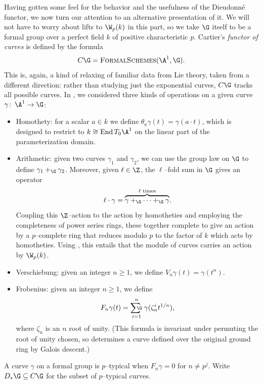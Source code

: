 Having gotten some feel for the behavior and the usefulness of the Dieudonn\'e functor, we now turn our attention to an alternative presentation of it.
We will not have to worry about lifts to \(\W_p(k)\) in this part, so we take \(\G\) itself to be a formal group over a perfect field \(k\) of positive characteristic \(p\).
Cartier's \textit{functor of curves} is defined by the formula \[C\G = \CatOf{FormalSchemes}(\A^1, \G).\]
This is, again, a kind of relaxing of familiar data from Lie theory, taken from a different direction: rather than studying just the exponential curves, \(C\G\) tracks all possible curves.
In , we considered three kinds of operations on a given curve \(\gamma\co \A^1 \to \G\):
\begin{itemize}
\item {}Homothety: for a scalar \(a \in k\) we define \(\theta_a \gamma(t) = \gamma(a \cdot t)\), which is designed to restrict to \(k \cong \End T_0 \A^1\) on the linear part of the parameterization domain.
\item {}Arithmetic: given two curves \(\gamma_1\) and \(\gamma_2\), we can use the group law on \(\G\) to define \(\gamma_1 +_{\G} \gamma_2\).
Moreover, given \(\ell \in \Z\), the \(\ell\)--fold sum in \(\G\) gives an operator \[\ell \cdot \gamma = \overset{\text{\(\ell\) times}}{\overbrace{\gamma +_{\G} \cdots +_{\G} \gamma}}.\]
Coupling this \(\Z\)--action to the action by homotheties and employing the completeness of power series rings, these together complete to give an action by a \(p\)--complete ring that reduces modulo \(p\) to the factor of \(k\) which acts by homotheties.
Using , this entails that the module of curves carries an action by \(\W_p(k)\).
\item {}Verschiebung: given an integer \(n \ge 1\), we define \(V_n \gamma(t) = \gamma(t^n)\).
\item {}Frobenius: given an integer \(n \ge 1\), we define \[F_n \gamma(t) = \sumG_{i=1}^n \gamma(\zeta_n^i t^{1/n}),\] where \(\zeta_{n}\) is an \(n\){\th} root of unity.
      (This formula is invariant under permuting the root of unity chosen, so determines a curve defined over the original ground ring by Galois descent.)
\end{itemize}

\begin{definition}
A curve \(\gamma\) on a formal group is \(p\)--typical when \(F_n \gamma = 0\) for \(n \ne p^j\).
Write \(D_*\G \subseteq C\G\) for the subset of \(p\)--typical curves.
\end{definition}


